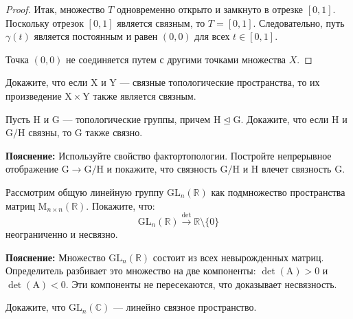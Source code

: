 \begin{example}
\begin{proof}
Итак, множество $ T $ одновременно открыто и замкнуто в отрезке $ [0,1] $. Поскольку отрезок $ [0,1] $ является связным, то $ T = [0,1] $. Следовательно, путь $ \gamma(t) $ является постоянным и равен $ (0,0) $ для всех $ t \in [0,1] $.

Точка $ (0,0) $ не соединяется путем с другими точками множества $ X $.
\end{proof}
\end{example}


\begin{task}
Докажите, что если $\mathrm{X}$ и $\mathrm{Y}$ — связные топологические пространства, то их произведение $\mathrm{X} \times \mathrm{Y}$ также является связным.
\end{task}

\begin{task}
Пусть $\mathrm{H}$ и $\mathrm{G}$ — топологические группы, причем $\mathrm{H} \trianglelefteq \mathrm{G}$. Докажите, что если $\mathrm{H}$ и $\mathrm{G}/\mathrm{H}$ связны, то $\mathrm{G}$ также связно.

\textbf{Пояснение:} 
Используйте свойство фактортопологии. Постройте непрерывное отображение $\mathrm{G} \to \mathrm{G}/\mathrm{H}$ и покажите, что связность $\mathrm{G}/\mathrm{H}$ и $\mathrm{H}$ влечет связность $\mathrm{G}$.
\end{task}

\begin{task}
Рассмотрим общую линейную группу $\mathrm{GL}_n(\mathbb{R})$ как подмножество пространства матриц $\mathrm{M}_{n \times n}(\mathbb{R})$. Покажите, что:
\[
\mathrm{GL}_n(\mathbb{R}) \overset{\det}{\longrightarrow} \mathbb{R} \setminus \{0\}
\]
неограниченно и несвязно.

\textbf{Пояснение:} 
Множество $\mathrm{GL}_n(\mathbb{R})$ состоит из всех невырожденных матриц. Определитель разбивает это множество на две компоненты: $\det(\mathrm{A}) > 0$ и $\det(\mathrm{A}) < 0$. Эти компоненты не пересекаются, что доказывает несвязность.
\end{task}

\begin{task}
Докажите, что $\mathrm{GL}_n(\mathbb{C})$ — линейно связное пространство.
\end{task}

